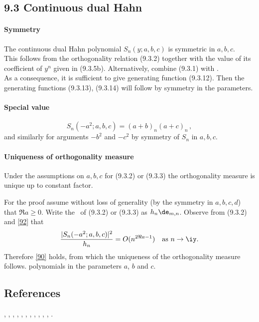 \documentclass[envcountchap,graybox]{svmono}
\newcounter{rom}
\begin{document}
\subsection*{9.3 Continuous dual Hahn}
\label{sec9.3}
%
\paragraph{Symmetry}
The continuous dual Hahn polynomial $S_n(y;a,b,c)$ is symmetric
in $a,b,c$.\\
This follows from the orthogonality relation (9.3.2)
together with the value of its coefficient of $y^n$ given in (9.3.5b).
Alternatively, combine (9.3.1) with .\\
As a consequence, it is sufficient to give generating function (9.3.12). Then the generating
functions (9.3.13), (9.3.14) will follow by symmetry in the parameters.
%
\paragraph{Special value}
\begin{equation}
S_n(-a^2;a,b,c)=(a+b)_n(a+c)_n\,,
\label{92}
\end{equation}
and similarly for arguments $-b^2$ and $-c^2$ by symmetry of $S_n$ in $a,b,c$.
%
\paragraph{Uniqueness of orthogonality measure}
Under the assumptions on $a,b,c$ for (9.3.2) or (9.3.3) the orthogonality
measure is unique up to constant factor.

For the proof assume without
loss of generality (by the symmetry in $a,b,c,d$) that $\Re a\geq0$.
Write the \RHS\ of (9.3.2) or (9.3.3) as $h_n\de_{m,n}$.
Observe from (9.3.2) and \eqref{92} that
\[
\frac{|S_n(-a^2;a,b,c)|^2}{h_n} = O(n^{2\Re a-1})\quad
\hbox{as $n\to\iy$.}
\]
Therefore \eqref{90} holds, from which the uniqueness of the orthogonality
measure follows.
polynomials in the parameters $a$, $b$ and $c$.

\subsection*{References}
\cite{AskeyWilson85}, \cite{IsmailLetVal89}, \cite{Koorn85}, \cite{Koorn88},
\cite{Lesky94II}, \cite{Lesky95I}, \cite{Lesky95II}, \cite{Letessier84},
\cite{Letessier86}, \cite{MimachiII}, \cite{Neuman}, \cite{ValentAssche}.
\end{document}
